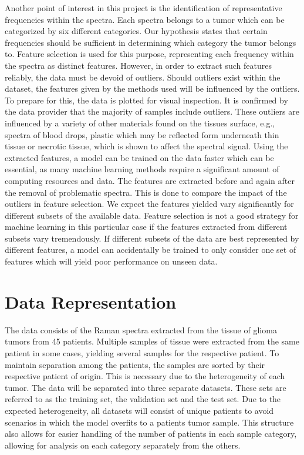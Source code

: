 Another point of interest in this project is the identification of representative frequencies within the spectra. Each spectra belongs to a tumor which can be categorized by six different categories. Our hypothesis states that certain frequencies should be sufficient in determining which category the tumor belongs to. Feature selection is used for this purpose, representing each frequency within the spectra as distinct features. However, in order to extract such features reliably, the data must be devoid of outliers. Should outliers exist within the dataset, the features given by the methods used will be influenced by the outliers. To prepare for this, the data is plotted for visual inspection. It is confirmed by the data provider that the majority of samples include outliers. These outliers are influenced by a variety of other materials found on the tissues surface, e.g., spectra of blood drops, plastic which may be reflected form underneath thin tissue or necrotic tissue, which is shown to affect the spectral signal. Using the extracted features, a model can be trained on the data faster which can be essential, as many machine learning methods require a significant amount of computing resources and data. The features are extracted before and again after the removal of problematic spectra. This is done to compare the impact of the outliers in feature selection. We expect the features yielded vary significantly for different subsets of the available data. Feature selection is not a good strategy for machine learning in this particular case if the features extracted from different subsets vary tremendously. If different subsets of the data are best represented by different features, a model can accidentally be trained to only consider one set of features which will yield poor performance on unseen data.


\section{Data Representation}
The data consists of the Raman spectra extracted from the tissue of glioma tumors from 45 patients. Multiple samples of tissue were extracted from the same patient in some cases, yielding several samples for the respective patient. To maintain separation among the patients, the samples are sorted by their respective patient of origin. This is necessary due to the heterogeneity of each tumor. The data will be separated into three separate datasets. These sets are referred to as the training set, the validation set and the test set. Due to the expected heterogeneity, all datasets will consist of unique patients to avoid scenarios in which the model overfits to a patients tumor sample. This structure also allows for easier handling of the number of patients in each sample category, allowing for analysis on each category separately from the others.


